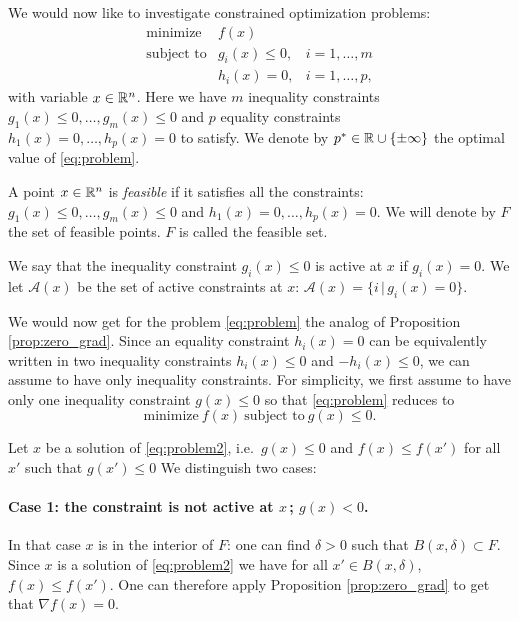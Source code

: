 \documentclass[11pt,nocut]{article}
\begin{document}
We would now like to investigate constrained optimization problems:
\begin{equation}\label{eq:problem}
	\begin{array}{lll}
		\text{minimize} & f(x) & \\
		\text{subject to} & g_i(x) \leq 0, & i=1, \dots, m \\
						  & h_i(x) = 0, & i=1, \dots, p,
	\end{array}
\end{equation}
with variable $x \in \mathbb{R}^n$.
Here we have $m$ inequality constraints $g_1(x) \leq 0, \dots, g_m(x)\leq  0$ and $p$ equality constraints $h_1(x) = 0, \dots, h_p(x) = 0$ to satisfy.
We denote by $p^* \in \mathbb{R} \cup \{\pm \infty\}$ the optimal value of \eqref{eq:problem}.

\begin{definition}
	A point $x \in \mathbb{R}^n$ is \emph{feasible} if it satisfies all the constraints: $g_1(x) \leq 0, \dots, g_m(x)\leq  0$ and $h_1(x) = 0, \dots, h_p(x) = 0$. We will denote by $F$ the set of feasible points. $F$ is called the feasible set.
\end{definition}

\begin{definition}
	We say that the inequality constraint $g_i(x) \leq 0$ is active at $x$ if $g_i(x) = 0$.
	We let $\mathcal{A}(x)$ be the set of active constraints at $x$: $\mathcal{A}(x) = \{ i \, | \, g_i(x) = 0\}$.
\end{definition}
We would now get for the problem \eqref{eq:problem} the analog of Proposition \ref{prop:zero_grad}.
Since an equality constraint $h_i(x) = 0$ can be equivalently written in two inequality constraints $h_i(x) \leq 0$ and $-h_i(x) \leq 0$, we can assume to have only inequality constraints.
For simplicity, we first assume to have only one inequality constraint $g(x) \leq 0$ so that \eqref{eq:problem} reduces to
\begin{equation}\label{eq:problem2}
	\text{minimize} \ f(x) \ \text{subject to} \ g(x) \leq 0.
\end{equation}


Let $x$ be a solution of \eqref{eq:problem2}, i.e.\ $g(x) \leq 0$ and $f(x) \leq f(x')$ for all $x'$ such that $g(x')\leq0$
We distinguish two cases:

\paragraph{Case 1: the constraint is not active at $x\,$; $g(x) <0$.} In that case $x$ is in the interior of $F$: one can find $\delta > 0$ such that $B(x,\delta) \subset F$. Since $x$ is a solution of \eqref{eq:problem2} we have for all $x' \in B(x,\delta)$, $f(x) \leq f(x')$. One can therefore apply Proposition \ref{prop:zero_grad} to get that $\nabla f(x) = 0$.
\end{document}
